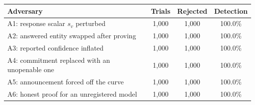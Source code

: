 \begin{tabular}{lccc}
\toprule
\textbf{Adversary} & \textbf{Trials} & \textbf{Rejected} & \textbf{Detection} \\
\midrule
A1: response scalar $s_v$ perturbed & 1{,}000 & 1{,}000 & 100.0\% \\
A2: answered entity swapped after proving & 1{,}000 & 1{,}000 & 100.0\% \\
A3: reported confidence inflated & 1{,}000 & 1{,}000 & 100.0\% \\
A4: commitment replaced with an unopenable one & 1{,}000 & 1{,}000 & 100.0\% \\
A5: announcement forced off the curve & 1{,}000 & 1{,}000 & 100.0\% \\
A6: honest proof for an unregistered model & 1{,}000 & 1{,}000 & 100.0\% \\
\bottomrule
\end{tabular}
